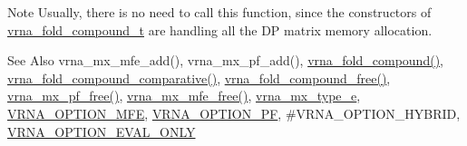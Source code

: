 \begin{DoxyNote}{Note}
Usually, there is no need to call this function, since the constructors of \hyperlink{group__fold__compound_ga1b0cef17fd40466cef5968eaeeff6166}{vrna\-\_\-fold\-\_\-compound\-\_\-t} are handling all the D\-P matrix memory allocation.
\end{DoxyNote}
\begin{DoxySeeAlso}{See Also}
vrna\-\_\-mx\-\_\-mfe\-\_\-add(), vrna\-\_\-mx\-\_\-pf\-\_\-add(), \hyperlink{group__fold__compound_ga6601d994ba32b11511b36f68b08403be}{vrna\-\_\-fold\-\_\-compound()}, \hyperlink{group__fold__compound_gad6bacc816af274922b13d947f708aa0c}{vrna\-\_\-fold\-\_\-compound\-\_\-comparative()}, \hyperlink{group__fold__compound_gadded6039d63f5d6509836e20321534ad}{vrna\-\_\-fold\-\_\-compound\-\_\-free()}, \hyperlink{group__dp__matrices_ga2283e69fd139fb8e58d7ade3b5773f9c}{vrna\-\_\-mx\-\_\-pf\-\_\-free()}, \hyperlink{group__dp__matrices_ga6a9422feb5dfe5c64050cebf447672d0}{vrna\-\_\-mx\-\_\-mfe\-\_\-free()}, \hyperlink{group__dp__matrices_ga6042ea1d58d01931e959791be6d89343}{vrna\-\_\-mx\-\_\-type\-\_\-e}, \hyperlink{group__fold__compound_gae63be9127fe7dcc1f9bb14f5bb1064ee}{V\-R\-N\-A\-\_\-\-O\-P\-T\-I\-O\-N\-\_\-\-M\-F\-E}, \hyperlink{group__fold__compound_gabfbadcddda3e74ce7f49035ef8f058f7}{V\-R\-N\-A\-\_\-\-O\-P\-T\-I\-O\-N\-\_\-\-P\-F}, \#\-V\-R\-N\-A\-\_\-\-O\-P\-T\-I\-O\-N\-\_\-\-H\-Y\-B\-R\-I\-D, \hyperlink{group__fold__compound_ga61469c423131552c8483229f8b6c7e0e}{V\-R\-N\-A\-\_\-\-O\-P\-T\-I\-O\-N\-\_\-\-E\-V\-A\-L\-\_\-\-O\-N\-L\-Y}
\end{DoxySeeAlso}

